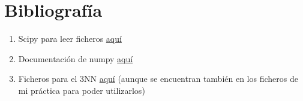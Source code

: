\documentclass[12pt]{article}
\begin{document}
\section{Bibliografía}
\begin{enumerate}
\item Scipy para leer ficheros \href{arff http://docs.scipy.org/doc/scipy/reference/generated/scipy.io.arff.loadarff.html}{aquí}
\item Documentación de numpy \href{http://docs.scipy.org/doc/numpy/user/index.html}{aquí}
\item Ficheros para el 3NN \href{https://github.com/agarciamontoro/metaheuristics/tree/master/src/knnGPU}{aquí} (aunque se encuentran también en los ficheros de mi práctica para poder utilizarlos)
\end{enumerate}
\end{document}
